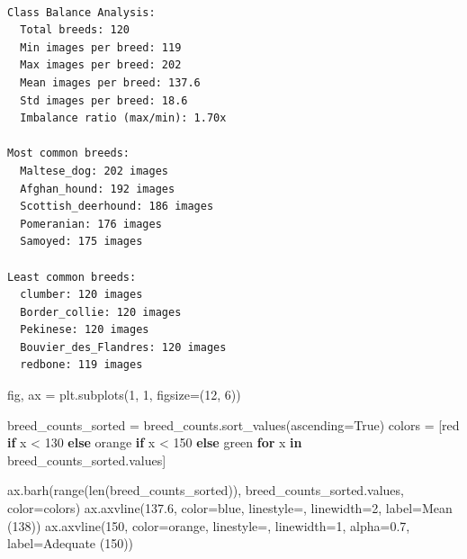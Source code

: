 \documentclass[
  letterpaper,
  DIV=11,
  numbers=noendperiod]{scrartcl}
\newenvironment{Shaded}{\begin{snugshade}}{\end{snugshade}}
\newcommand{\BuiltInTok}[1]{\textcolor[rgb]{0.00,0.23,0.31}{#1}}
\newcommand{\ControlFlowTok}[1]{\textcolor[rgb]{0.00,0.23,0.31}{\textbf{#1}}}
\newcommand{\DecValTok}[1]{\textcolor[rgb]{0.68,0.00,0.00}{#1}}
\newcommand{\FloatTok}[1]{\textcolor[rgb]{0.68,0.00,0.00}{#1}}
\newcommand{\KeywordTok}[1]{\textcolor[rgb]{0.00,0.23,0.31}{\textbf{#1}}}
\newcommand{\NormalTok}[1]{\textcolor[rgb]{0.00,0.23,0.31}{#1}}
\newcommand{\OperatorTok}[1]{\textcolor[rgb]{0.37,0.37,0.37}{#1}}
\newcommand{\StringTok}[1]{\textcolor[rgb]{0.13,0.47,0.30}{#1}}
\newcommand{\VariableTok}[1]{\textcolor[rgb]{0.07,0.07,0.07}{#1}}
\renewenvironment{Shaded}{%
  \begin{tcolorbox}[%
    enhanced,%
    colback=codebg,%
    colframe=codebg,%
    borderline west={3pt}{0pt}{sectionblue},%
    boxrule=0pt,%
    arc=0pt,%
    boxsep=5pt,%
    left=2mm,%
    right=2mm,%
    top=2mm,%
    bottom=2mm%
  ]%
}{%
  \end{tcolorbox}%
}
\begin{document}
\begin{verbatim}

Class Balance Analysis:
  Total breeds: 120
  Min images per breed: 119
  Max images per breed: 202
  Mean images per breed: 137.6
  Std images per breed: 18.6
  Imbalance ratio (max/min): 1.70x

Most common breeds:
  Maltese_dog: 202 images
  Afghan_hound: 192 images
  Scottish_deerhound: 186 images
  Pomeranian: 176 images
  Samoyed: 175 images

Least common breeds:
  clumber: 120 images
  Border_collie: 120 images
  Pekinese: 120 images
  Bouvier_des_Flandres: 120 images
  redbone: 119 images
\end{verbatim}

\begin{Shaded}
\begin{Highlighting}[]
\NormalTok{fig, ax }\OperatorTok{=}\NormalTok{ plt.subplots(}\DecValTok{1}\NormalTok{, }\DecValTok{1}\NormalTok{, figsize}\OperatorTok{=}\NormalTok{(}\DecValTok{12}\NormalTok{, }\DecValTok{6}\NormalTok{))}

\NormalTok{breed\_counts\_sorted }\OperatorTok{=}\NormalTok{ breed\_counts.sort\_values(ascending}\OperatorTok{=}\VariableTok{True}\NormalTok{)}
\NormalTok{colors }\OperatorTok{=}\NormalTok{ [}\StringTok{\textquotesingle{}red\textquotesingle{}} \ControlFlowTok{if}\NormalTok{ x }\OperatorTok{\textless{}} \DecValTok{130} \ControlFlowTok{else} \StringTok{\textquotesingle{}orange\textquotesingle{}} \ControlFlowTok{if}\NormalTok{ x }\OperatorTok{\textless{}} \DecValTok{150} \ControlFlowTok{else} \StringTok{\textquotesingle{}green\textquotesingle{}} 
          \ControlFlowTok{for}\NormalTok{ x }\KeywordTok{in}\NormalTok{ breed\_counts\_sorted.values]}

\NormalTok{ax.barh(}\BuiltInTok{range}\NormalTok{(}\BuiltInTok{len}\NormalTok{(breed\_counts\_sorted)), breed\_counts\_sorted.values, color}\OperatorTok{=}\NormalTok{colors)}
\NormalTok{ax.axvline(}\FloatTok{137.6}\NormalTok{, color}\OperatorTok{=}\StringTok{\textquotesingle{}blue\textquotesingle{}}\NormalTok{, linestyle}\OperatorTok{=}\StringTok{\textquotesingle{}{-}{-}\textquotesingle{}}\NormalTok{, linewidth}\OperatorTok{=}\DecValTok{2}\NormalTok{, label}\OperatorTok{=}\StringTok{\textquotesingle{}Mean (138)\textquotesingle{}}\NormalTok{)}
\NormalTok{ax.axvline(}\DecValTok{150}\NormalTok{, color}\OperatorTok{=}\StringTok{\textquotesingle{}orange\textquotesingle{}}\NormalTok{, linestyle}\OperatorTok{=}\StringTok{\textquotesingle{}{-}{-}\textquotesingle{}}\NormalTok{, linewidth}\OperatorTok{=}\DecValTok{1}\NormalTok{, alpha}\OperatorTok{=}\FloatTok{0.7}\NormalTok{, label}\OperatorTok{=}\StringTok{\textquotesingle{}Adequate (150)\textquotesingle{}}\NormalTok{)}


\end{Highlighting}
\end{Shaded}
\end{document}
